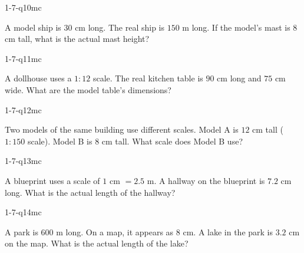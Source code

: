 \begin{practiceQuestion}{1-7-q10}{mc}
\begin{questionText}
A model ship is $30$ cm long. The real ship is $150$ m long. If the model's mast is $8$ cm tall, what is the actual mast height?
\end{questionText}
\end{practiceQuestion}

\begin{practiceQuestion}{1-7-q11}{mc}
\begin{questionText}
A dollhouse uses a $1 : 12$ scale. The real kitchen table is $90$ cm long and $75$ cm wide. What are the model table's dimensions?
\end{questionText}
\end{practiceQuestion}

\begin{practiceQuestion}{1-7-q12}{mc}
\begin{questionText}
Two models of the same building use different scales. Model A is $12$ cm tall ($1 : 150$ scale). Model B is $8$ cm tall. What scale does Model B use?
\end{questionText}
\end{practiceQuestion}

\begin{practiceQuestion}{1-7-q13}{mc}
\begin{questionText}
A blueprint uses a scale of $1$ cm $= 2.5$ m. A hallway on the blueprint is $7.2$ cm long. What is the actual length of the hallway?
\end{questionText}
\end{practiceQuestion}

\begin{practiceQuestion}{1-7-q14}{mc}
\begin{questionText}
A park is $600$ m long. On a map, it appears as $8$ cm. A lake in the park is $3.2$ cm on the map. What is the actual length of the lake?
\end{questionText}
\end{practiceQuestion}

